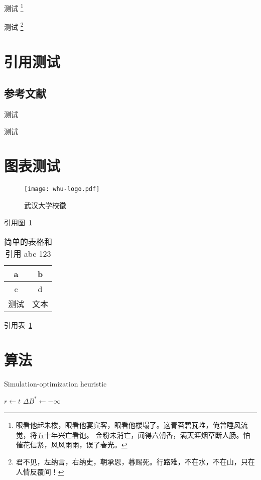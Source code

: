 \documentclass[type = master,class = academic]{whu-thesis}
\begin{document}
测试 \footnote{眼看他起朱楼，眼看他宴宾客，眼看他楼塌了。这青苔碧瓦堆，俺曾睡风流觉，将五十年兴亡看饱。
金粉未消亡，闻得六朝香，满天涯烟草断人肠。怕催花信紧，风风雨雨，误了春光。}

测试 \footnote[3]{君不见，左纳言，右纳史，朝承恩，暮赐死。行路难，不在水，不在山，只在人情反覆间！}


\section{引用测试}

\subsection{参考文献}

测试 \cite{whu-bachelor:1,whu-bachelor:2,whu-bachelor:3,whu-bachelor:5,whu-bachelor:7}

测试 \cite*{whu-bachelor:1,whu-bachelor:2,whu-bachelor:3,whu-bachelor:7}



\section{图表测试}

\begin{figure}[ht]
  \centering
  \texttt{[image: whu-logo.pdf]}
  \caption{武汉大学校徽}
  \label{fig:武汉大学校徽}
\end{figure}

引用图~\ref{fig:武汉大学校徽}

\begin{table}[ht]
  \centering
  \caption{%
    简单的表格和引用 abc 123 %
  }
  \label{table:简单的表格}
  \begin{tabular}{cc}
    \hline
    a & b \\ \hline
    c & d \\ \hline
    测试 & 文本 \\ \hline
  \end{tabular}
\end{table}

引用表~\ref{table:简单的表格}


\section{算法}

\begin{algorithm}
\caption{Simulation-optimization heuristic}\label{algorithm}
$r\leftarrow t$\;
$\Delta B^{\ast}\leftarrow -\infty$\;
\end{algorithm}
\end{document}
